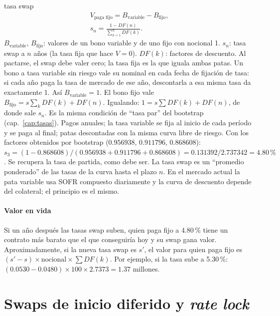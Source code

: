 \begin{ficha}{tasa swap}
\begin{gather*}
V_{\text{paga fijo}}=B_{\text{variable}}-B_{\text{fijo}},\\
s_n=\frac{1-DF(n)}{\sum_{k=1}^n DF(k)}.
\end{gather*}
 $B_{\text{variable}}$, $B_{\text{fijo}}$: valores de un bono variable y de uno fijo con nocional 1. $s_n$: tasa swap a $n$ años (la tasa fija que hace $V=0$). $DF(k)$: factores de descuento.
 Al pactarse, el swap debe valer cero; la tasa fija es la que iguala ambas patas.
 Un bono a tasa variable sin riesgo vale su nominal en cada fecha de fijación de tasa: si cada año paga la tasa de mercado de ese año, descontarla a esa misma tasa da exactamente 1. Así $B_{\text{variable}}=1$. El bono fijo vale $B_{\text{fijo}}=s\sum_k DF(k)+DF(n)$. Igualando: $1=s\sum DF(k)+DF(n)$, de donde sale $s_n$. Es la misma condición de \enquote{tasa par} del bootstrap (cap.~\ref{cap:tasas}).
 Pagos anuales; la tasa variable se fija al inicio de cada período y se paga al final; patas descontadas con la misma curva libre de riesgo.
 Con los factores obtenidos por bootstrap ($0.956938$, $0.911796$, $0.868608$): $s_3=(1-0.868608)/(0.956938+0.911796+0.868608)=0.131392/2.737342=4.80\,\%$. Se recupera la tasa de partida, como debe ser.
 La tasa swap es un \enquote{promedio ponderado} de las tasas de la curva hasta el plazo $n$.
 En el mercado actual la pata variable usa SOFR compuesto diariamente y la curva de descuento depende del colateral; el principio es el mismo.
\end{ficha}

\paragraph{Valor en vida} Si un año después las tasas swap suben, quien paga fijo a 4.80\,\% tiene un contrato más barato que el que conseguiría hoy y su swap gana valor. Aproximadamente, si la nueva tasa swap es $s'$, el valor para quien paga fijo es $(s'-s)\times\text{nocional}\times\sum DF(k)$. Por ejemplo, si la tasa sube a 5.30\,\%: $(0.0530-0.0480)\times100\times2.7373=1.37$ millones.

\section{Swaps de inicio diferido y \emph{rate lock}}

